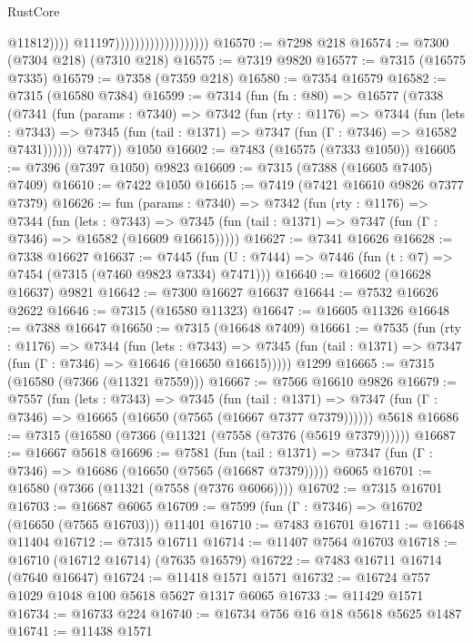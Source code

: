 \begin{lexlean}{RustCore}
\begin{coremodule}
                                                  @11812))))
                                          @11197)))))))))))))))))))
@16570 := @7298 @218
@16574 := @7300 (@7304 @218) (@7310 @218)
@16575 := @7319 @9820
@16577 := @7315 (@16575 @7335)
@16579 := @7358 (@7359 @218)
@16580 := @7354 @16579
@16582 := @7315 (@16580 @7384)
@16599 := @7314
    (fun (fn : @80) =>
    @16577
      (@7338
        (@7341
          (fun (params : @7340) =>
          @7342
            (fun (rty : @1176) =>
            @7344
              (fun (lets : @7343) =>
              @7345 (fun (tail : @1371) => @7347 (fun (Γ : @7346) => @16582 @7431))))))
        @7477))
    @1050
@16602 := @7483 (@16575 (@7333 @1050))
@16605 := @7396 (@7397 @1050) @9823
@16609 := @7315 (@7388 (@16605 @7405) @7409)
@16610 := @7422 @1050
@16615 := @7419 (@7421 @16610 @9826 @7377 @7379)
@16626 := fun (params : @7340) =>
  @7342
    (fun (rty : @1176) =>
    @7344
      (fun (lets : @7343) =>
      @7345 (fun (tail : @1371) => @7347 (fun (Γ : @7346) => @16582 (@16609 @16615)))))
@16627 := @7341 @16626
@16628 := @7338 @16627
@16637 := @7445 (fun (U : @7444) => @7446 (fun (t : @7) => @7454 (@7315 (@7460 @9823 @7334) @7471)))
@16640 := @16602 (@16628 @16637) @9821
@16642 := @7300 @16627 @16637
@16644 := @7532 @16626 @2622
@16646 := @7315 (@16580 @11323)
@16647 := @16605 @11326
@16648 := @7388 @16647
@16650 := @7315 (@16648 @7409)
@16661 := @7535
    (fun (rty : @1176) =>
    @7344
      (fun (lets : @7343) =>
      @7345 (fun (tail : @1371) => @7347 (fun (Γ : @7346) => @16646 (@16650 @16615)))))
    @1299
@16665 := @7315 (@16580 (@7366 (@11321 @7559)))
@16667 := @7566 @16610 @9826
@16679 := @7557
    (fun (lets : @7343) =>
    @7345
      (fun (tail : @1371) =>
      @7347 (fun (Γ : @7346) => @16665 (@16650 (@7565 (@16667 @7377 @7379))))))
    @5618
@16686 := @7315 (@16580 (@7366 (@11321 (@7558 (@7376 (@5619 @7379))))))
@16687 := @16667 @5618
@16696 := @7581
    (fun (tail : @1371) => @7347 (fun (Γ : @7346) => @16686 (@16650 (@7565 (@16687 @7379)))))
    @6065
@16701 := @16580 (@7366 (@11321 (@7558 (@7376 @6066))))
@16702 := @7315 @16701
@16703 := @16687 @6065
@16709 := @7599 (fun (Γ : @7346) => @16702 (@16650 (@7565 @16703))) @11401
@16710 := @7483 @16701
@16711 := @16648 @11404
@16712 := @7315 @16711
@16714 := @11407 @7564 @16703
@16718 := @16710 (@16712 @16714) (@7635 @16579)
@16722 := @7483 @16711 @16714 (@7640 @16647)
@16724 := @11418 @1571 @1571
@16732 := @16724 @757 @1029 @1048 @100 @5618 @5627 @1317 @6065
@16733 := @11429 @1571
@16734 := @16733 @224
@16740 := @16734 @756 @16 @18 @5618 @5625 @1487
@16741 := @11438 @1571

\end{coremodule}
\end{lexlean}
